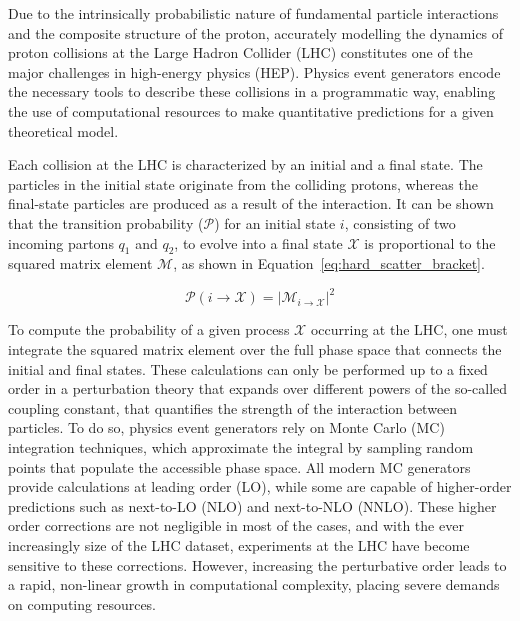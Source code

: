 
Due to the intrinsically probabilistic nature of fundamental particle interactions and the composite structure of the proton, accurately modelling the dynamics of proton collisions at the Large Hadron Collider (LHC) constitutes one of the major challenges in high-energy physics (HEP). Physics event generators encode the necessary tools to describe these collisions in a programmatic way, enabling the use of computational resources to make quantitative predictions for a given theoretical model.

Each collision at the LHC is characterized by an initial and a final state. The particles in the initial state originate from the colliding protons, whereas the final-state particles are produced as a result of the interaction. It can be shown that the transition probability (\(\mathcal{P}\)) for an initial state \(i\), consisting of two incoming partons \(q_1\) and \(q_2\), to evolve into a final state \(\mathcal{X}\) is proportional to the squared matrix element \(\mathcal{M}\), as shown in Equation~\ref{eq:hard_scatter_bracket}.

\begin{equation}
    \mathcal{P}(i \rightarrow \mathcal{X}) = |\mathcal{M}_{i \rightarrow \mathcal{X}}|^2
    \label{eq:hard_scatter_bracket}
\end{equation}

To compute the probability of a given process \(\mathcal{X}\) occurring at the LHC, one must integrate the squared matrix element over the full phase space that connects the initial and final states. These calculations can only be performed up to a fixed order in a perturbation theory that expands over different powers of the so-called coupling constant, that quantifies the strength of the interaction between particles. To do so, physics event generators rely on Monte Carlo (MC) integration techniques, which approximate the integral by sampling random points that populate the accessible phase space. All modern MC generators provide calculations at leading order (LO), while some are capable of higher-order predictions such as next-to-LO (NLO) and next-to-NLO (NNLO). These higher order corrections are not negligible in most of the cases, and with the ever increasingly size of the LHC dataset, experiments at the LHC have become sensitive to these corrections. However, increasing the perturbative order leads to a rapid, non-linear growth in computational complexity, placing severe demands on computing resources.

